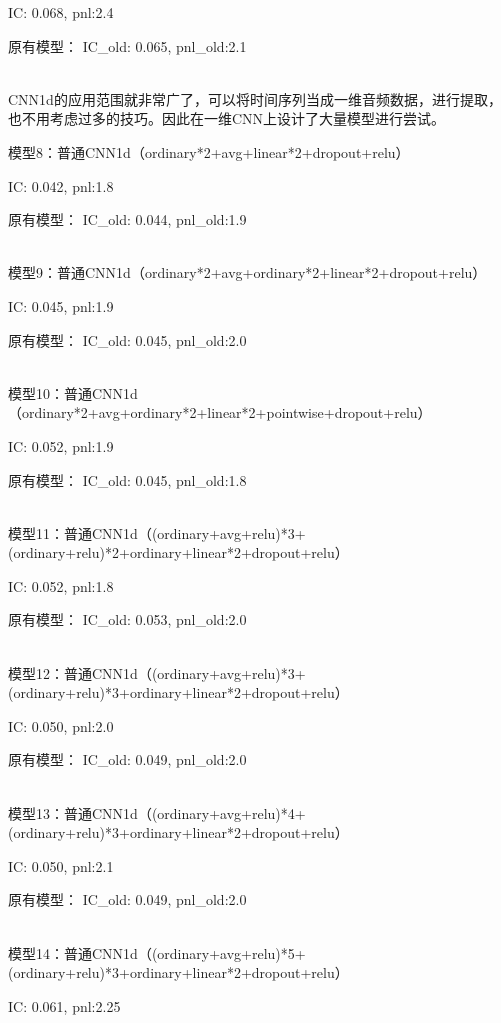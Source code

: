 \documentclass[11pt]{ctexart}
\begin{document}
{\kaishu \small IC: 0.068, pnl:2.4}

原有模型：
{\kaishu \small IC\_old: 0.065, pnl\_old:2.1}

~\\
CNN1d的应用范围就非常广了，可以将时间序列当成一维音频数据，进行提取，也不用考虑过多的技巧。因此在一维CNN上设计了大量模型进行尝试。

模型8：普通CNN1d（ordinary*2+avg+linear*2+dropout+relu）

{\kaishu \small IC: 0.042, pnl:1.8}

原有模型：
{\kaishu \small IC\_old: 0.044, pnl\_old:1.9}

~\\
模型9：普通CNN1d（ordinary*2+avg+ordinary*2+linear*2+dropout+relu）

{\kaishu \small IC: 0.045, pnl:1.9}

原有模型：
{\kaishu \small IC\_old: 0.045, pnl\_old:2.0}

~\\
模型10：普通CNN1d（ordinary*2+avg+ordinary*2+linear*2+pointwise+dropout+relu）

{\kaishu \small IC: 0.052, pnl:1.9}

原有模型：
{\kaishu \small IC\_old: 0.045, pnl\_old:1.8}

~\\
模型11：普通CNN1d（(ordinary+avg+relu)*3+(ordinary+relu)*2+ordinary+linear*2+dropout+relu）

{\kaishu \small IC: 0.052, pnl:1.8}

原有模型：
{\kaishu \small IC\_old: 0.053, pnl\_old:2.0}

~\\
模型12：普通CNN1d（(ordinary+avg+relu)*3+(ordinary+relu)*3+ordinary+linear*2+dropout+relu）

{\kaishu \small IC: 0.050, pnl:2.0}

原有模型：
{\kaishu \small IC\_old: 0.049, pnl\_old:2.0}

~\\
模型13：普通CNN1d（(ordinary+avg+relu)*4+(ordinary+relu)*3+ordinary+linear*2+dropout+relu）

{\kaishu \small IC: 0.050, pnl:2.1}

原有模型：
{\kaishu \small IC\_old: 0.049, pnl\_old:2.0}

~\\
模型14：普通CNN1d（(ordinary+avg+relu)*5+(ordinary+relu)*3+ordinary+linear*2+dropout+relu）

{\kaishu \small IC: 0.061, pnl:2.25}
\end{document}
